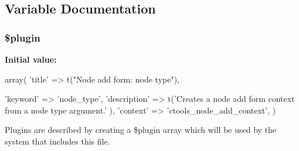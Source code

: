 \subsection{Variable Documentation}
\hypertarget{node__add_8inc_ada8a7130088351710bb02ed622d6bf65}{
\subsubsection[{\$plugin}]{\setlength{\rightskip}{0pt plus 5cm}\$plugin}}
\label{node__add_8inc_ada8a7130088351710bb02ed622d6bf65}
{\bfseries Initial value:}
\begin{DoxyCode}
 array(
  'title' => t("Node add form: node type"),
  
  'keyword' => 'node_type',
  'description' => t('Creates a node add form context from a node type argument.'
      ),
  'context' => 'ctools_node_add_context',
)
\end{DoxyCode}
Plugins are described by creating a \$plugin array which will be used by the system that includes this file. 
